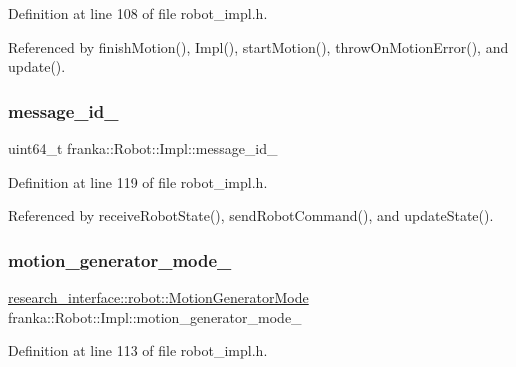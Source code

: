 Definition at line 108 of file robot\+\_\+impl.\+h.



Referenced by finish\+Motion(), Impl(), start\+Motion(), throw\+On\+Motion\+Error(), and update().

\mbox{\label{classfranka_1_1Robot_1_1Impl_aed154fce2f3a44a60b7397405974d395}} 
\subsubsection{\texorpdfstring{message\+\_\+id\+\_\+}{message\_id\_}}
{\footnotesize\ttfamily uint64\+\_\+t franka\+::\+Robot\+::\+Impl\+::message\+\_\+id\+\_\+\hspace{0.3cm}{\ttfamily [private]}}



Definition at line 119 of file robot\+\_\+impl.\+h.



Referenced by receive\+Robot\+State(), send\+Robot\+Command(), and update\+State().

\mbox{\label{classfranka_1_1Robot_1_1Impl_a209c353b4da1c85d3e633cab161a0d39}} 
\subsubsection{\texorpdfstring{motion\+\_\+generator\+\_\+mode\+\_\+}{motion\_generator\_mode\_}}
{\footnotesize\ttfamily \hyperlink{namespaceresearch__interface_1_1robot_abd2451eb963a1843f1eb066ebd4b06e8}{research\+\_\+interface\+::robot\+::\+Motion\+Generator\+Mode} franka\+::\+Robot\+::\+Impl\+::motion\+\_\+generator\+\_\+mode\+\_\+\hspace{0.3cm}{\ttfamily [private]}}



Definition at line 113 of file robot\+\_\+impl.\+h.



